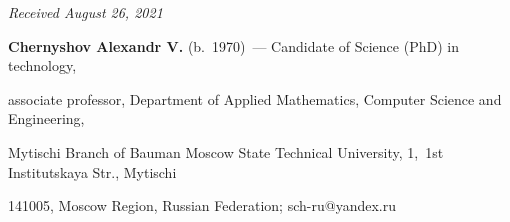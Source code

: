 \vspace*{-3pt}





\hfill{\small\textit{Received August 26, 2021}} 
















\Contrl





\noindent


\textbf{Chernyshov Alexandr V.} (b.\ 1970)~--- Candidate of Science (PhD) in technology, 


associate professor, Department of Applied Mathematics, Computer Science and Engineering, 


Mytischi Branch of Bauman Moscow State Technical University, 1,~1st Institutskaya Str., Mytischi 


141005, Moscow Region, Russian Federation; \mbox{sch-ru@yandex.ru}


  


\label{end\stat}





\renewcommand{\bibname}{\protect\rm Литература} 


